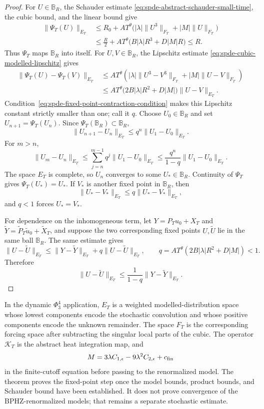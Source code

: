 \begin{proof}
For \(U\in\mathbb B_R\), the Schauder estimate
\eqref{eq:spde-abstract-schauder-small-time}, the cubic bound, and the
linear bound give
\[
\begin{aligned}
  \|\Psi_T(U)\|_{E_T}
  &\leq
  R_0
  +
  A T^\theta
  \bigl(|\lambda|\|U^3\|_{F_T}+|M|\|U\|_{F_T}\bigr)\\
  &\leq
  \frac{R}{2}
  +
  A T^\theta
  \bigl(B|\lambda|R^3+D|M|R\bigr)
  \leq R .
\end{aligned}
\]
Thus \(\Psi_T\) maps \(\mathbb B_R\) into itself.  For
\(U,V\in\mathbb B_R\), the Lipschitz estimate
\eqref{eq:spde-cubic-modelled-lipschitz} gives
\[
\begin{aligned}
  \|\Psi_T(U)-\Psi_T(V)\|_{E_T}
  &\leq
  A T^\theta
  \left(
    |\lambda|\|U^3-V^3\|_{F_T}
    +|M|\|U-V\|_{F_T}
  \right)\\
  &\leq
  A T^\theta
  \bigl(2B|\lambda|R^2+D|M|\bigr)\|U-V\|_{E_T}.
\end{aligned}
\]
Condition~\eqref{eq:spde-fixed-point-contraction-condition} makes this
Lipschitz constant strictly smaller than one; call it \(q\).  Choose
\(U_0\in\mathbb B_R\) and set \(U_{n+1}=\Psi_T(U_n)\).  Since
\(\Psi_T(\mathbb B_R)\subset\mathbb B_R\),
\[
  \|U_{n+1}-U_n\|_{E_T}
  \leq
  q^n\|U_1-U_0\|_{E_T}.
\]
For \(m>n\),
\[
  \|U_m-U_n\|_{E_T}
  \leq
  \sum_{j=n}^{m-1}q^j\|U_1-U_0\|_{E_T}
  \leq
  \frac{q^n}{1-q}\|U_1-U_0\|_{E_T}.
\]
The space \(E_T\) is complete, so \(U_n\) converges to some
\(U_\ast\in\mathbb B_R\).  Continuity of \(\Psi_T\) gives
\(\Psi_T(U_\ast)=U_\ast\).  If \(V_\ast\) is another fixed point in
\(\mathbb B_R\), then
\[
  \|U_\ast-V_\ast\|_{E_T}
  \leq
  q\|U_\ast-V_\ast\|_{E_T},
\]
and \(q<1\) forces \(U_\ast=V_\ast\).

For dependence on the inhomogeneous term, let \(Y=P_Tu_0+X_T\) and
\(\widetilde Y=\widetilde P_T\widetilde u_0+\widetilde X_T\), and suppose
the two corresponding fixed points \(U,\widetilde U\) lie in the same ball
\(\mathbb B_R\).  The same estimate gives
\[
  \|U-\widetilde U\|_{E_T}
  \leq
  \|Y-\widetilde Y\|_{E_T}
  +
  q\|U-\widetilde U\|_{E_T},
  \qquad
  q=A T^\theta(2B|\lambda|R^2+D|M|)<1.
\]
Therefore
\[
  \|U-\widetilde U\|_{E_T}
  \leq
  \frac{1}{1-q}\|Y-\widetilde Y\|_{E_T}.
\]
\end{proof}

In the dynamic \(\Phi^4_3\) application, \(E_T\) is a weighted
modelled-distribution space whose lowest components encode the stochastic
convolution and whose positive components encode the unknown remainder.
The space \(F_T\) is the corresponding forcing space after subtracting the
singular local parts of the cubic.  The operator \(\mathcal K_T\) is the
abstract heat integration map, and
\[
  M=3\lambda C_{1,\epsilon}-9\lambda^2C_{2,\epsilon}+c_{\rm fin}
\]
in the finite-cutoff equation before passing to the renormalized model.  The
theorem proves the fixed-point step once the model bounds, product bounds,
and Schauder bound have been established.  It does not prove convergence of
the BPHZ-renormalized models; that remains a separate stochastic estimate.

